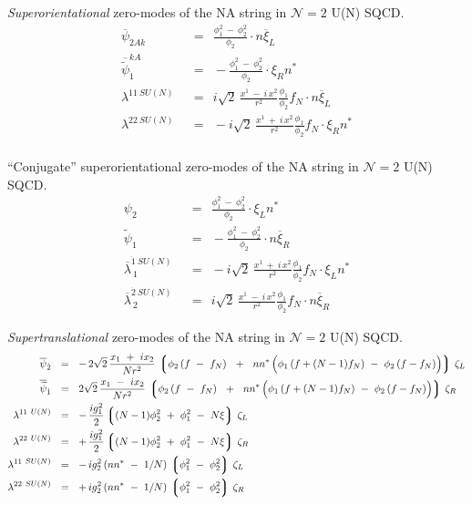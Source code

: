 \documentclass{letter}
\newcommand{\wt}{\widetilde}
\newcommand{\ov}{\overline}
\newcommand{\lgr}{\left\lgroup}
\newcommand{\rgr}{\right\rgroup}
\begin{document}
 {\it Superorientational} zero-modes of the NA string in ${\mathcal N}=2$ U(N) SQCD.
\begin{align*}
%
\overline{\psi}_{\dot{2}Ak} & ~~=~~ \frac{\phi_1^2 ~-~ \phi_2^2}{\phi_2} \cdot n \overline{\xi}_L   \\
%
\overline{\wt{\psi}}_{\dot{1}}^{kA}  & ~~=~~ - \frac{\phi_1^2 ~-~ \phi_2^2}{\phi_2} \cdot \xi_R n^*  \\
%
\lambda^{11\ SU(N)} & ~~=~~ i \sqrt{2}\, \frac{ x^1 ~-~ i\, x^2 }{r^2} \frac{\phi_1}{\phi_2} f_N \cdot n \overline{\xi}_L \\
%
\lambda^{22\ SU(N)} & ~~=~~ - i \sqrt{2}\, \frac{ x^1 ~+~ i\, x^2 }{r^2} \frac{\phi_1}{\phi_2} f_N \cdot \xi_R n^* \\
\end{align*}

 ``Conjugate'' superorientational zero-modes of the NA string in ${\mathcal N}=2$ U(N) SQCD.
\begin{align*}
%
{\psi}_{2} & ~~=~~ \frac{\phi_1^2 ~-~ \phi_2^2}{\phi_2} \cdot \xi_L n^*   \\
%
\wt{\psi}_{1}  & ~~=~~ - \frac{\phi_1^2 ~-~ \phi_2^2}{\phi_2} \cdot n \ov{\xi}_R  \\
%
\ov{\lambda}^{\dot{1}\ SU(N)}_{\ 1} & ~~=~~ - i \sqrt{2}\, \frac{ x^1 ~+~ i\, x^2 }{r^2} \frac{\phi_1}{\phi_2} f_N \cdot \xi_L n^* \\
%
\ov{\lambda}^{\dot{2}\ SU(N)}_{\ 2} & ~~=~~  i \sqrt{2}\, \frac{ x^1 ~-~ i\, x^2 }{r^2} \frac{\phi_1}{\phi_2} f_N \cdot n \ov{\xi}_R 
\end{align*}

\pagebreak

 {\it Supertranslational} zero-modes of the NA string in ${\mathcal N}=2$ U(N) SQCD.
\begin{align*}
%
\ov{\psi}_{\dot{2}}	& ~~=~~  -\,  2\sqrt{2}\, \frac{x_1 ~+~ i x_2}{N r^2} \,
		\lgr \phi_2\, (f ~-~ f_N) ~~+~~
			n n^*\, \Bigl( \phi_1\,( f + (N-1) f_N) ~-~ \phi_2\, (f - f_N) \Bigr) 
		\rgr\, \zeta_L 
		\\
%
\ov{\wt{\psi}}_{\dot{1}} & ~~=~~    2\sqrt{2} \, \frac{x_1 ~-~ i x_2}{N r^2} \,
		\lgr \phi_2\, (f ~-~ f_N) ~~+~~
			n n^*\, \Bigl( \phi_1\,( f + (N-1) f_N) ~-~ \phi_2\, (f - f_N) \Bigr) 
		\rgr\, \zeta_R
		\\
%
\lambda^{11\ U(N)} 	& ~~=~~ -\, \frac{i g_1^2}{2} \lgr (N-1)\phi_2^2  ~+~ \phi_1^2 ~-~ N\xi \rgr \, \zeta_L 
		\\
%
\lambda^{22\ U(N)} 	& ~~=~~ +\, \frac{i g_1^2}{2} \lgr (N-1)\phi_2^2  ~+~ \phi_1^2 ~-~ N\xi \rgr \, \zeta_R 
		\\
%
\lambda^{11\ SU(N)}	& ~~=~~ -\, {i g_2^2}\, ( nn^* ~-~ 1/N )\, \lgr \phi_1^2 ~-~ \phi_2^2 \rgr\, \zeta_L
		\\
%
\lambda^{22\ SU(N)}	& ~~=~~ +\, {i g_2^2}\, ( nn^* ~-~ 1/N )\, \lgr \phi_1^2 ~-~ \phi_2^2 \rgr\, \zeta_R
\end{align*}
\end{document}
